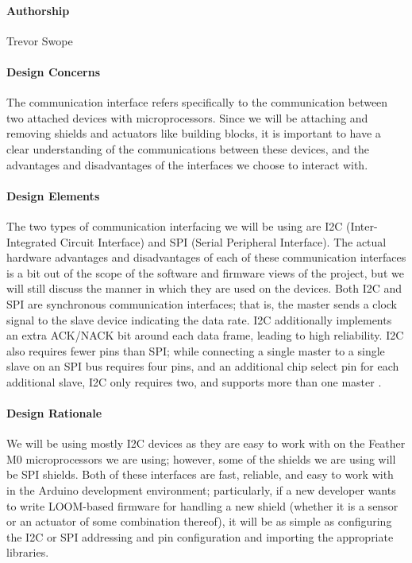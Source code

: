 \documentclass[onecolumn, draftclsnofoot,10pt, compsoc]{IEEEtran}
\begin{document}
\paragraph{Authorship}
    Trevor Swope

\paragraph{Design Concerns}
    The communication interface refers specifically to the communication between two attached devices with microprocessors. Since we will be attaching and removing shields and actuators like building blocks, it is important to have a clear understanding of the communications between these devices, and the advantages and disadvantages of the interfaces we choose to interact with.

\paragraph{Design Elements}
    The two types of communication interfacing we will be using are I2C (Inter-Integrated Circuit Interface) and SPI (Serial Peripheral Interface).  The actual hardware advantages and disadvantages of each of these communication interfaces is a bit out of the scope of the software and firmware views of the project, but we will still discuss the manner in which they are used on the devices. Both I2C and SPI are synchronous communication interfaces; that is, the master sends a clock signal to the slave device indicating the data rate. I2C additionally implements an extra ACK/NACK bit around each data frame, leading to high reliability. I2C also requires fewer pins than SPI; while connecting a single master to a single slave on an SPI bus requires four pins, and an additional chip select pin for each additional slave, I2C only requires two, and supports more than one master \cite{I2C} \cite{SPI}.

\paragraph{Design Rationale}
    We will be using mostly I2C devices as they are easy to work with on the Feather M0 microprocessors we are using; however, some of the shields we are using will be SPI shields. Both of these interfaces are fast, reliable, and easy to work with in the Arduino development environment; particularly, if a new developer wants to write LOOM-based firmware for handling a new shield (whether it is a sensor or an actuator of some combination thereof), it will be as simple as configuring the I2C or SPI addressing and pin configuration and importing the appropriate libraries.
\end{document}
